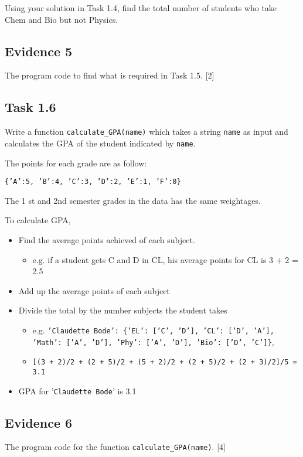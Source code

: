 Using your solution in Task 1.4, find the total number of students
who take \textquotedbl Chem\textquotedbl{} and \textquotedbl Bio\textquotedbl{}
but not \textquotedbl Physics\textquotedbl . 

\subsection*{Evidence 5 }

The program code to find what is required in Task 1.5. \hfill{}{[}2{]}

\subsection*{Task 1.6 }

Write a function \texttt{calculate\_GPA(name)} which takes a string
\texttt{name} as input and calculates the GPA of the student indicated
by \texttt{name}. 

The points for each grade are as follow: 

\texttt{\{'A':5, 'B':4, 'C':3, 'D':2, 'E':1, 'F':0\} }

The 1 st and 2nd semester grades in the data has the same weightages. 

To calculate GPA,
\begin{itemize}
\item Find the average points achieved of each subject.
\begin{itemize}
\item e.g. if a student gets C and D in \textquotedbl CL\textquotedbl ,
his average points for \textquotedbl CL\textquotedbl{} is 3 + 2 =
2.5 
\end{itemize}
\item Add up the average points of each subject 
\item Divide the total by the number subjects the student takes 
\begin{itemize}
\item e.g. \texttt{'Claudette Bode': \{'EL': {[}'C', 'D'{]}, 'CL': {[}'D',
'A'{]}, 'Math': {[}'A', 'D'{]}, 'Phy': {[}'A', 'D'{]}, 'Bio': {[}'D',
'C'{]}\}}, 
\item \texttt{{[}(3 + 2)/2 + (2 + 5)/2 + (5 + 2)/2 + (2 + 5)/2 + (2 + 3)/2{]}/5
= 3.1}
\end{itemize}
\item GPA for '\texttt{Claudette Bode}' is 3.1 
\end{itemize}

\subsection*{Evidence 6 }

The program code for the function \texttt{calculate\_GPA(name)}.\hfill{}
{[}4{]}